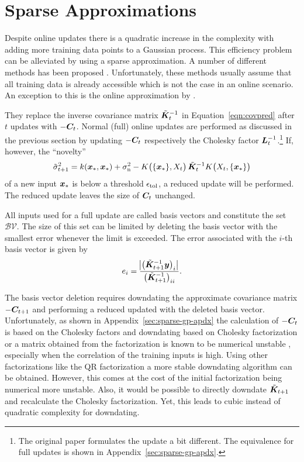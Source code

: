 \section{Sparse Approximations}
Despite online updates there is a quadratic increase in the complexity with 
adding more training data points to a Gaussian process. This efficiency problem 
can be alleviated by using a sparse approximation. A number of different methods 
has been proposed \parencites[chapter~8 
in][]{Rasmussen:2006vz}{QuinoneroCandela:2005wp}. Unfortunately, these methods 
usually assume that all training data is already accessible which is not the 
case in an online scenario. An exception to this is the online approximation by 
\textcite{Csato:2002fp}.

They replace the inverse covariance matrix $\tilde{\bm{K}}_t^{-1}$ in 
Equation~\ref{eqn:covpred} after $t$ updates with $-\bm{C}_t$. Normal (full) 
online updates are performed as discussed in the previous section by updating 
$-\bm{C}_t$ respectively the Cholesky factor $\bm{L}_t^{-1}$.\footnote{The 
    original paper formulates the update a bit different. The equivalence for 
    full updates is shown in Appendix~\ref{sec:sparse-gp-apdx}.} If, however, 
the ``novelty''
\begin{equation}
    \tilde{\sigma}^2_{t+1} = k(\vc x_*, \vc x_*) + \sigma\ped{n}^2 
    - K\!\del{\{\vc x_*\}, X_t} \tilde{\mat K}_t^{-1} K\!\del{X_t, \{\vc x_*\}}
\end{equation}
of a new input $\bm{x}_*$ is below a threshold $\epsilon_{\mathrm{tol}}$, a reduced 
update will be performed. The reduced update leaves the size of $\bm{C}_t$ 
unchanged.

All inputs used for a full update are called basis vectors and constitute the 
set~$\mathcal{BV}$. The size of this set can be limited by deleting the basis 
vector with the smallest error whenever the limit is exceeded. The error 
associated with the $i$-th basis vector is given by
\begin{equation}
    e_i = \frac{\abs[1]{\del[1]{\tilde{\mat K}_{t+1}^{-1} 
                \vc{y}}_i}}{\del[1]{\tilde{\mat{K}}_{t+1}^{-1}}_{ii}} \text{.}
\end{equation}

The basis vector deletion requires downdating the approximate covariance matrix 
$-\bm{C}_{t+1}$ and performing a reduced updated with the deleted basis vector.  
Unfortunately, as shown in Appendix~\ref{sec:sparse-gp-apdx} the calculation of 
$-\bm{C}_t$ is based on the Cholesky factors and downdating based on Cholesky 
factorization or a matrix obtained from the factorization is known to be 
numerical unstable \parencite{Bjorck:1994dz}, especially when the correlation of 
the training inputs is high. Using other factorizations like the QR 
factorization a more stable downdating algorithm can be obtained.  However, this 
comes at the cost of the initial factorization being numerical more unstable.  
Also, it would be possible to directly downdate $\tilde{\bm{K}}_{t+1}$ and 
recalculate the Cholesky factorization. Yet, this leads to cubic instead of 
quadratic complexity for downdating.

